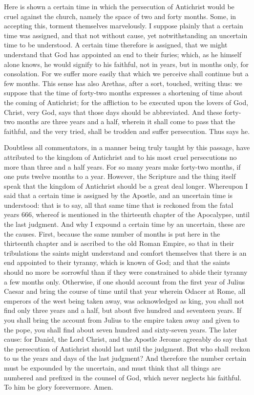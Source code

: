 Here is shown a certain time in which the persecution of Antichrist would be cruel against the church, namely the space of two and forty months. Some, in accepting this, torment themselves marvelously. I suppose plainly that a certain time was assigned, and that not without cause, yet notwithstanding an uncertain time to be understood. A certain time therefore is assigned, that we might understand that God has appointed an end to their furies; which, as he himself alone knows, he would signify to his faithful, not in years, but in months only, for consolation. For we suffer more easily that which we perceive shall continue but a few months. This sense has also Arethas, after a sort, touched, writing thus: we suppose that the time of forty-two months expresses a shortening of time about the coming of Antichrist; for the affliction to be executed upon the lovers of God, Christ, very God, says that those days should be abbreviated. And these forty-two months are three years and a half, wherein it shall come to pass that the faithful, and the very tried, shall be trodden and suffer persecution. Thus says he.

Doubtless all commentators, in a manner being truly taught by this passage, have attributed to the kingdom of Antichrist and to his most cruel persecutions no more than three and a half years. For so many years make forty-two months, if one puts twelve months to a year. However, the Scripture and the thing itself speak that the kingdom of Antichrist should be a great deal longer. Whereupon I said that a certain time is assigned by the Apostle, and an uncertain time is understood: that is to say, all that same time that is reckoned from the fatal years 666, whereof is mentioned in the thirteenth chapter of the Apocalypse, until the last judgment. And why I expound a certain time by an uncertain, these are the causes. First, because the same number of months is put here in the thirteenth chapter and is ascribed to the old Roman Empire, so that in their tribulations the saints might understand and comfort themselves that there is an end appointed to their tyranny, which is known of God; and that the saints should no more be sorrowful than if they were constrained to abide their tyranny a few months only. Otherwise, if one should account from the first year of Julius Caesar and bring the course of time until that year wherein Odacer at Rome, all emperors of the west being taken away, was acknowledged as king, you shall not find only three years and a half, but about five hundred and seventeen years. If you shall bring the account from Julius to the empire taken away and given to the pope, you shall find about seven hundred and sixty-seven years. The later cause: for Daniel, the Lord Christ, and the Apostle Jerome agreeably do say that the persecution of Antichrist should last until the judgment. But who shall reckon to us the years and days of the last judgment? And therefore the number certain must be expounded by the uncertain, and must think that all things are numbered and prefixed in the counsel of God, which never neglects his faithful. To him be glory forevermore. Amen.
